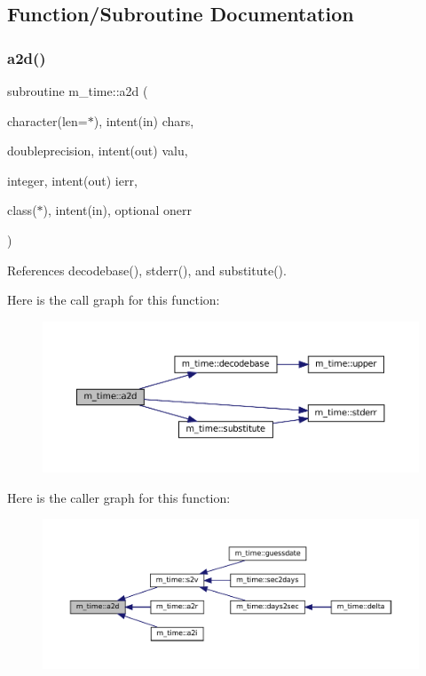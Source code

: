 \subsection{Function/\+Subroutine Documentation}
\mbox{\label{namespacem__time_a9d508147e28034267073619ba8a0e910}} 
\subsubsection{\texorpdfstring{a2d()}{a2d()}}
{\footnotesize\ttfamily subroutine m\+\_\+time\+::a2d (\begin{DoxyParamCaption}\item[{character(len=$\ast$), intent(in)}]{chars,  }\item[{doubleprecision, intent(out)}]{valu,  }\item[{integer, intent(out)}]{ierr,  }\item[{class($\ast$), intent(in), optional}]{onerr }\end{DoxyParamCaption})\hspace{0.3cm}{\ttfamily [private]}}



References decodebase(), stderr(), and substitute().

Here is the call graph for this function\+:\nopagebreak
\begin{figure}[H]
\begin{center}
\leavevmode
\includegraphics[width=350pt]{namespacem__time_a9d508147e28034267073619ba8a0e910_cgraph}
\end{center}
\end{figure}
Here is the caller graph for this function\+:\nopagebreak
\begin{figure}[H]
\begin{center}
\leavevmode
\includegraphics[width=350pt]{namespacem__time_a9d508147e28034267073619ba8a0e910_icgraph}
\end{center}
\end{figure}
\mbox{\label{namespacem__time_a200e48a4e0096b4343b0b72c95becd3d}} 
